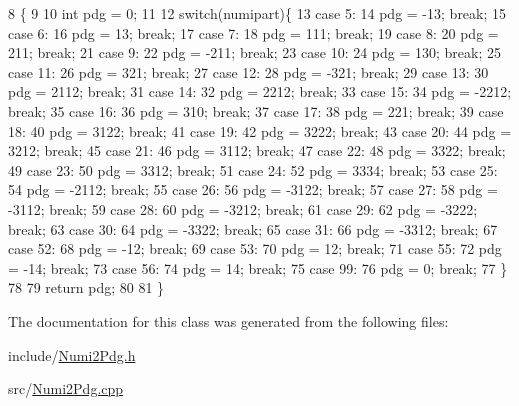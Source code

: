 \begin{DoxyCode}
8                                 \{
9   
10   \textcolor{keywordtype}{int} pdg = 0;
11   
12   \textcolor{keywordflow}{switch}(numipart)\{
13   \textcolor{keywordflow}{case} 5:
14     pdg = -13; \textcolor{keywordflow}{break};
15   \textcolor{keywordflow}{case} 6:
16     pdg =  13; \textcolor{keywordflow}{break};
17   \textcolor{keywordflow}{case} 7:
18     pdg = 111; \textcolor{keywordflow}{break};
19   \textcolor{keywordflow}{case} 8:
20     pdg = 211; \textcolor{keywordflow}{break};  
21   \textcolor{keywordflow}{case} 9:
22     pdg = -211; \textcolor{keywordflow}{break}; 
23   \textcolor{keywordflow}{case} 10:
24     pdg = 130; \textcolor{keywordflow}{break};
25   \textcolor{keywordflow}{case} 11:
26     pdg = 321; \textcolor{keywordflow}{break};
27   \textcolor{keywordflow}{case} 12:
28     pdg = -321; \textcolor{keywordflow}{break};
29   \textcolor{keywordflow}{case} 13:
30     pdg = 2112; \textcolor{keywordflow}{break};  
31   \textcolor{keywordflow}{case} 14:
32     pdg = 2212; \textcolor{keywordflow}{break};
33   \textcolor{keywordflow}{case} 15:
34     pdg = -2212; \textcolor{keywordflow}{break};
35   \textcolor{keywordflow}{case} 16:
36     pdg = 310; \textcolor{keywordflow}{break};
37   \textcolor{keywordflow}{case} 17:
38     pdg = 221; \textcolor{keywordflow}{break};
39   \textcolor{keywordflow}{case} 18:
40     pdg = 3122; \textcolor{keywordflow}{break};  
41   \textcolor{keywordflow}{case} 19:
42     pdg = 3222; \textcolor{keywordflow}{break};
43   \textcolor{keywordflow}{case} 20:
44     pdg = 3212; \textcolor{keywordflow}{break};
45   \textcolor{keywordflow}{case} 21:
46     pdg = 3112; \textcolor{keywordflow}{break};
47   \textcolor{keywordflow}{case} 22:
48     pdg = 3322; \textcolor{keywordflow}{break};
49   \textcolor{keywordflow}{case} 23:
50     pdg = 3312; \textcolor{keywordflow}{break};  
51   \textcolor{keywordflow}{case} 24:
52     pdg = 3334; \textcolor{keywordflow}{break};
53   \textcolor{keywordflow}{case} 25:
54     pdg = -2112; \textcolor{keywordflow}{break};
55   \textcolor{keywordflow}{case} 26:
56     pdg = -3122; \textcolor{keywordflow}{break};
57   \textcolor{keywordflow}{case} 27:
58     pdg = -3112; \textcolor{keywordflow}{break};
59   \textcolor{keywordflow}{case} 28:
60     pdg = -3212; \textcolor{keywordflow}{break};  
61   \textcolor{keywordflow}{case} 29:
62     pdg = -3222; \textcolor{keywordflow}{break};
63   \textcolor{keywordflow}{case} 30:
64     pdg = -3322; \textcolor{keywordflow}{break};
65   \textcolor{keywordflow}{case} 31:
66     pdg = -3312; \textcolor{keywordflow}{break};
67   \textcolor{keywordflow}{case} 52:
68     pdg = -12; \textcolor{keywordflow}{break};
69   \textcolor{keywordflow}{case} 53:
70     pdg = 12; \textcolor{keywordflow}{break};  
71   \textcolor{keywordflow}{case} 55:
72     pdg = -14;  \textcolor{keywordflow}{break};
73   \textcolor{keywordflow}{case} 56:
74     pdg = 14; \textcolor{keywordflow}{break};
75   \textcolor{keywordflow}{case} 99:
76     pdg = 0; \textcolor{keywordflow}{break};
77   \}  
78 
79   \textcolor{keywordflow}{return} pdg;
80 
81 \}
\end{DoxyCode}


The documentation for this class was generated from the following files\-:\begin{DoxyCompactItemize}
\item 
include/\hyperlink{_numi2_pdg_8h}{Numi2\-Pdg.\-h}\item 
src/\hyperlink{_numi2_pdg_8cpp}{Numi2\-Pdg.\-cpp}\end{DoxyCompactItemize}
